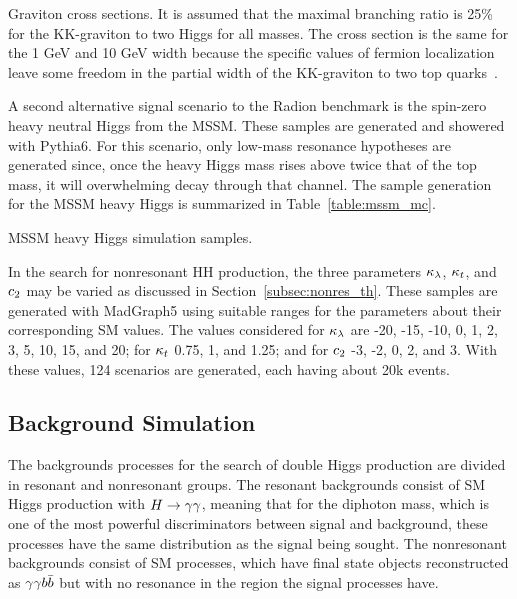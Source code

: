 \begin{table}[htbp!]
  \centering
  \renewcommand{\arraystretch}{1.4}
  \caption{Graviton cross sections. It is assumed that the maximal
branching ratio is 25\% for the KK-graviton to two Higgs for all masses. The cross section is the
same for the 1 GeV and 10 GeV width because the specific values of fermion localization leave some
freedom in the partial width of the KK-graviton to two top quarks~\cite{Agashe:2007zd}.}
  
  \label{table:graviton_xsec}
\end{table}

A second alternative signal scenario to the Radion benchmark is the spin-zero heavy neutral Higgs from
the MSSM. These samples are generated and showered with Pythia6. For this scenario, only low-mass
resonance hypotheses are generated since, once the heavy Higgs mass rises above twice that of the top
mass, it will overwhelming decay through that channel. The sample generation for the MSSM heavy
Higgs is summarized in Table~\ref{table:mssm_mc}.

\begin{table}[htbp!]
  \centering
  \renewcommand{\arraystretch}{1.4}
  \caption{MSSM heavy Higgs simulation samples.}
  
  \label{table:mssm_mc}
\end{table}

In the search for nonresonant HH production, the three parameters $\kappa_{\lambda}$, $\kappa_{t}$, and $c_2$
may be varied as discussed in Section~\ref{subsec:nonres_th}. These samples are generated
with MadGraph5 using suitable ranges for the parameters about their corresponding SM values. The
values considered for $\kappa_{\lambda}$ are -20, -15, -10, 0, 1, 2, 3, 5, 10, 15, and 20; for $\kappa_{t}$ 0.75, 1, and 1.25; and for $c_2$ -3, -2, 0, 2, and 3.
With these values, 124 scenarios are generated, each having about 20k events.

\subsection{Background Simulation\label{subsec:bkg_samples}}

The backgrounds processes for the search of double Higgs production are divided in resonant and
nonresonant groups. The resonant backgrounds consist of SM Higgs production with $H\to\gamma\gamma$, meaning
that for the diphoton mass,
which is one of the most powerful discriminators between signal and background,
these processes have the same distribution as the signal being sought. The nonresonant backgrounds
consist of SM processes, which have final state objects reconstructed as $\gamma\gamma b\bar{b}$ but with no resonance
in the region the signal processes have.

